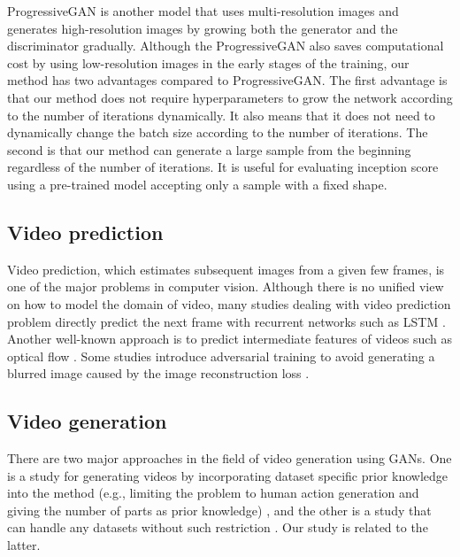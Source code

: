 \documentclass[twocolumn]{svjour3}
\begin{document}
ProgressiveGAN \cite{Karras2018} is another model that uses multi-resolution images
and generates high-resolution images by growing both the generator and the discriminator gradually.
Although the ProgressiveGAN also saves computational cost by using low-resolution images in the early stages of the training, our method has two advantages compared to ProgressiveGAN.
The first advantage is that our method does not require hyperparameters to grow the network according to the number of iterations dynamically. It also means that it does not need to dynamically change the batch size according to the number of iterations.
The second is that our method can generate a large sample from the beginning regardless of the number of iterations. It is useful for evaluating inception score \cite{Salimans2016} using a pre-trained model accepting only a sample with a fixed shape.

\subsection{Video prediction}
















Video prediction, which estimates subsequent images from a given few frames, is one of the major problems in computer vision. Although there is no unified view on how to model the domain of video, many studies dealing with video prediction problem directly predict the next frame with recurrent networks such as LSTM
\cite{Ranzato2014,Oh2015,Srivastava2015,Kalchbrenner2016,Finn2016,Lotter2017,Ebert2017,Babaeizadeh2018,Byeon2018,Denton2018,Lee2018}.
Another well-known approach is to predict intermediate features of videos such as optical flow \cite{Liang2017,Liu2017a,Hao2018,Li2018}.
Some studies introduce adversarial training to avoid generating a blurred image caused by the image reconstruction loss \cite{Mathieu2016,Liang2017,Lee2018}.

\subsection{Video generation}







There are two major approaches in the field of video generation using GANs.
One is a study for generating videos by incorporating dataset specific prior knowledge into the method (e.g., limiting the problem to human action generation and giving the number of parts as prior knowledge) \cite{Cai2018,Zhao2018,Yang2018},
and the other is a study that can handle any datasets without such restriction \cite{Vondrick2016,Saito2017,Ohnishi2018,Tulyakov2018,Acharya2018}.
Our study is related to the latter.
\end{document}
